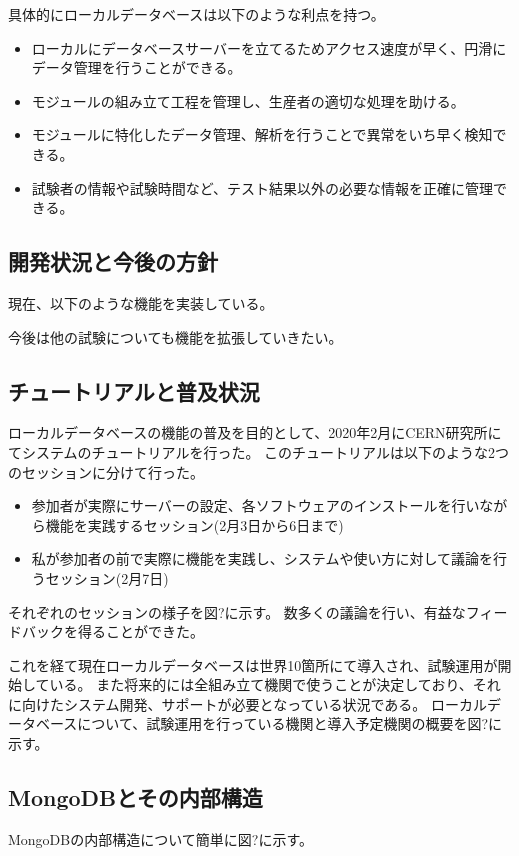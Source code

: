 具体的にローカルデータベースは以下のような利点を持つ。

\begin{itemize}
  \item ローカルにデータベースサーバーを立てるためアクセス速度が早く、円滑にデータ管理を行うことができる。
  \item モジュールの組み立て工程を管理し、生産者の適切な処理を助ける。
  \item モジュールに特化したデータ管理、解析を行うことで異常をいち早く検知できる。
  \item 試験者の情報や試験時間など、テスト結果以外の必要な情報を正確に管理できる。
\end{itemize}

\subsection{開発状況と今後の方針}
現在、以下のような機能を実装している。

今後は他の試験についても機能を拡張していきたい。

\subsection{チュートリアルと普及状況}
ローカルデータベースの機能の普及を目的として、2020年2月にCERN研究所にてシステムのチュートリアルを行った。
このチュートリアルは以下のような2つのセッションに分けて行った。

\begin{itemize}
  \item 参加者が実際にサーバーの設定、各ソフトウェアのインストールを行いながら機能を実践するセッション(2月3日から6日まで)
  \item 私が参加者の前で実際に機能を実践し、システムや使い方に対して議論を行うセッション(2月7日)
\end{itemize}

それぞれのセッションの様子を図?に示す。
数多くの議論を行い、有益なフィードバックを得ることができた。

これを経て現在ローカルデータベースは世界10箇所にて導入され、試験運用が開始している。
また将来的には全組み立て機関で使うことが決定しており、それに向けたシステム開発、サポートが必要となっている状況である。
ローカルデータベースについて、試験運用を行っている機関と導入予定機関の概要を図?に示す。

\subsection{MongoDBとその内部構造}
MongoDBの内部構造について簡単に図?に示す。

